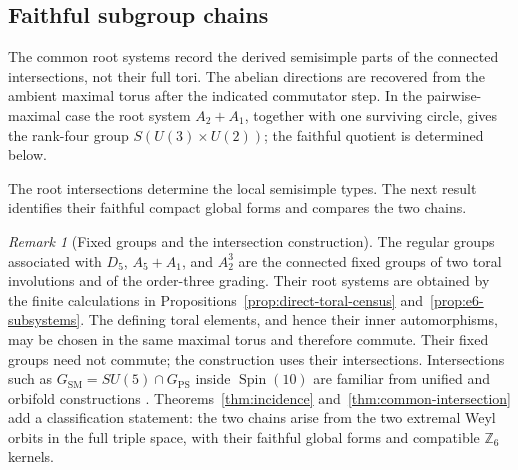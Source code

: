 \documentclass[11pt]{article}
\theoremstyle{remark}
\newtheorem*{remark}{Remark}
\begin{document}
\subsection{Faithful subgroup chains}

The common root systems record the derived semisimple parts of the connected
intersections, not their full tori.  The abelian directions are recovered from
the ambient maximal torus after the indicated commutator step.  In the
pairwise-maximal case the root system \(A_2+A_1\), together with one surviving
circle, gives the rank-four group \(S(U(3)\times U(2))\); the faithful quotient
is determined below.

The root intersections determine the local semisimple types. The next result
identifies their faithful compact global forms and compares the two chains.

\begin{remark}[Fixed groups and the intersection construction]
The regular groups associated with \(D_5\), \(A_5+A_1\), and \(A_2^3\)
are the connected fixed groups of two toral involutions and of the
order-three grading.  Their root systems are obtained by the finite calculations in
Propositions~\ref{prop:direct-toral-census} and~\ref{prop:e6-subsystems}.
The defining toral
elements, and hence their inner automorphisms, may be chosen in the same
maximal torus and therefore commute.  Their fixed groups need not commute;
the construction uses their intersections. Intersections such as
\(G_{\mathrm{SM}}=SU(5)\cap G_{\mathrm{PS}}\) inside
\(\operatorname{Spin}(10)\) are familiar from unified and orbifold
constructions \cite{OrbifoldIntersections}. Theorems~\ref{thm:incidence} and~\ref{thm:common-intersection} add a classification statement: the two chains
arise from the two extremal Weyl orbits in the full triple space, with their
faithful global forms and compatible \(\mathbb Z_6\) kernels.
\end{remark}
\end{document}
